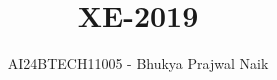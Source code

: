 \documentclass[journal]{IEEEtran}
\begin{document}

\vspace{3cm}

\title{XE-2019}
\author{AI24BTECH11005 - Bhukya Prajwal Naik
}
{\let\newpage\relax\maketitle}

\renewcommand{\thefigure}{\theenumi}
\renewcommand{\thetable}{\theenumi}
\setlength{\intextsep}{10pt} %


\renewcommand{\thetable}{\theenumi}
\end{document}
